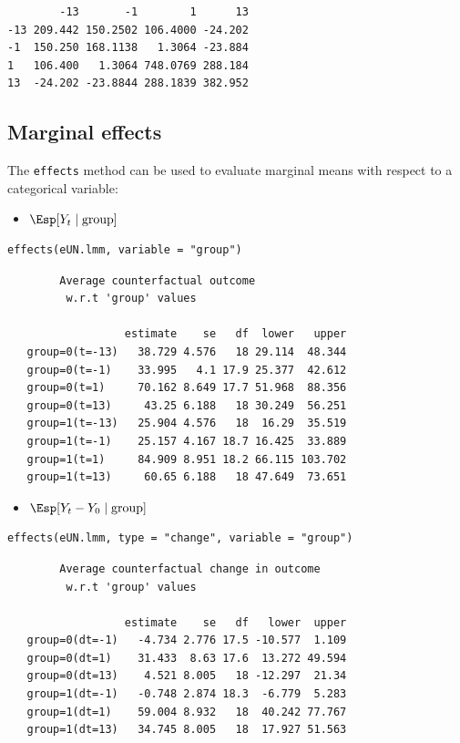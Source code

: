 \documentclass[12pt]{article}
\begin{document}
\begin{verbatim}
        -13       -1        1      13
-13 209.442 150.2502 106.4000 -24.202
-1  150.250 168.1138   1.3064 -23.884
1   106.400   1.3064 748.0769 288.184
13  -24.202 -23.8844 288.1839 382.952
\end{verbatim}


\clearpage

\subsection{Marginal effects}
\label{sec:orgc77dffe}

The \texttt{effects} method can be used to evaluate marginal means with
respect to a categorical variable:
\begin{itemize}
\item \(\Esp[Y_t \mid \text{group}]\)
\end{itemize}
\lstset{language=r,label= ,caption= ,captionpos=b,numbers=none}
\begin{lstlisting}
effects(eUN.lmm, variable = "group")
\end{lstlisting}

\begin{verbatim}
		Average counterfactual outcome
		 w.r.t 'group' values 

                  estimate    se   df  lower   upper
   group=0(t=-13)   38.729 4.576   18 29.114  48.344
   group=0(t=-1)    33.995   4.1 17.9 25.377  42.612
   group=0(t=1)     70.162 8.649 17.7 51.968  88.356
   group=0(t=13)     43.25 6.188   18 30.249  56.251
   group=1(t=-13)   25.904 4.576   18  16.29  35.519
   group=1(t=-1)    25.157 4.167 18.7 16.425  33.889
   group=1(t=1)     84.909 8.951 18.2 66.115 103.702
   group=1(t=13)     60.65 6.188   18 47.649  73.651
\end{verbatim}

\begin{itemize}
\item \(\Esp[Y_t-Y_0 \mid \text{group}]\)
\end{itemize}
\lstset{language=r,label= ,caption= ,captionpos=b,numbers=none}
\begin{lstlisting}
effects(eUN.lmm, type = "change", variable = "group")
\end{lstlisting}

\begin{verbatim}
		Average counterfactual change in outcome
		 w.r.t 'group' values 

                  estimate    se   df   lower  upper
   group=0(dt=-1)   -4.734 2.776 17.5 -10.577  1.109
   group=0(dt=1)    31.433  8.63 17.6  13.272 49.594
   group=0(dt=13)    4.521 8.005   18 -12.297  21.34
   group=1(dt=-1)   -0.748 2.874 18.3  -6.779  5.283
   group=1(dt=1)    59.004 8.932   18  40.242 77.767
   group=1(dt=13)   34.745 8.005   18  17.927 51.563
\end{verbatim}
\end{document}
